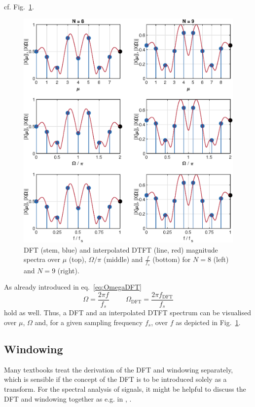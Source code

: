 \documentclass[11pt,a4paper,DIV=12]{scrartcl}
\begin{document}
cf. Fig.~\ref{DTFT_Interpolation}.
%
\begin{figure}
		\centering
		\includegraphics[]{graphics/DTFT_Interpolation}
		\caption{DFT (stem, blue) and interpolated DTFT (line, red) magnitude
		spectra over $\mu$ (top), $\Omega/\pi$ (middle) and $\frac{f}{f_s}$ (bottom)
		for $N=8$ (left) and $N=9$ (right).}
		\label{DTFT_Interpolation}
\end{figure}
%
As already introduced in eq.~\eqref{eq:OmegaDFT}
%
\begin{equation}
\Omega=\frac{2\pi f}{f_s} \hspace{1cm} \Omega_\text{DFT}=\frac{2\pi f_\text{DFT}}{f_s}
\end{equation}
hold as well.
%
Thus, a DFT and an interpolated DTFT spectrum can be visualised over $\mu$,
$\Omega$ and, for a given sampling frequency $f_s$, over $f$ as depicted in
Fig.~\ref{DTFT_Interpolation}.

\subsection{Windowing}
Many textbooks treat the derivation of the DFT and windowing separately, which
is sensible if the concept of the DFT is to be introduced solely as a transform.
%
For the spectral analysis of signals, it might be helpful to discuss the DFT
and windowing together as e.g. in \cite{Moeser2011},
\cite[Ch.~7.3,~7.4]{Kammeyer2002}.
\end{document}
